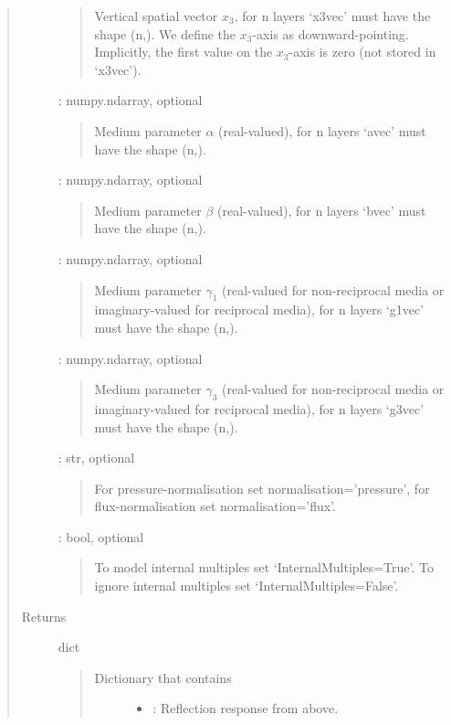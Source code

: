 \documentclass[letterpaper,10pt,english]{sphinxmanual}
\begin{document}
\begin{fulllineitems}
\begin{fulllineitems}
\begin{quote}
\begin{description}
\begin{quote}
Vertical spatial vector \(x_3\), for n layers ‘x3vec’ must have the shape (n,). We define the \(x_3\)-axis as downward-pointing. Implicitly, the first value on the \(x_3\)-axis is zero (not stored in ‘x3vec’).
\end{quote}

 : numpy.ndarray, optional
\begin{quote}

Medium parameter \(\alpha\) (real-valued), for n layers ‘avec’ must have the shape (n,).
\end{quote}

 : numpy.ndarray, optional
\begin{quote}

Medium parameter \(\beta\) (real-valued), for n layers ‘bvec’ must have the shape (n,).
\end{quote}

 : numpy.ndarray, optional
\begin{quote}

Medium parameter \(\gamma_1\) (real-valued for non-reciprocal media or imaginary-valued for reciprocal media), for n layers ‘g1vec’ must have the shape (n,).
\end{quote}

 : numpy.ndarray, optional
\begin{quote}

Medium parameter \(\gamma_3\) (real-valued for non-reciprocal media or imaginary-valued for reciprocal media), for n layers ‘g3vec’ must have the shape (n,).
\end{quote}

 : str, optional
\begin{quote}

For pressure-normalisation set normalisation=’pressure’, for flux-normalisation set normalisation=’flux’.
\end{quote}

 : bool, optional
\begin{quote}

To model internal multiples set ‘InternalMultiples=True’. To ignore internal multiples set ‘InternalMultiples=False’.
\end{quote}

\item[{Returns}] \leavevmode
dict
\begin{quote}
\begin{description}
\item[{Dictionary that contains }] \leavevmode\begin{itemize}
\item {} 
: Reflection response from above.


\end{itemize}
\end{description}
\end{quote}
\end{description}
\end{quote}
\end{fulllineitems}
\end{fulllineitems}
\end{document}
